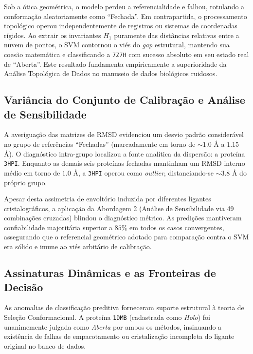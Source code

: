 \documentclass[12pt, a4paper]{article}
\theoremstyle{plain}
\theoremstyle{definition}
\theoremstyle{remark}
\newcommand{\ident}{\hspace{2em}}
\begin{document}
\ident Sob a ótica geométrica, o modelo perdeu a referencialidade e falhou, rotulando a conformação aleatoriamente como \enquote{Fechada}. Em contrapartida, o processamento topológico operou independentemente de registros ou sistemas de coordenadas rígidos. Ao extrair os invariantes $H_1$ puramente das distâncias relativas entre a nuvem de pontos, o SVM contornou o viés do \textit{gap} estrutural, mantendo sua coesão matemática e classificando a \texttt{7Z7H} com sucesso absoluto em seu estado real de \enquote{Aberta}. Este resultado fundamenta empiricamente a superioridade da Análise Topológica de Dados no manuseio de dados biológicos ruidosos.

\subsection{Variância do Conjunto de Calibração e Análise de Sensibilidade}

\ident A averiguação das matrizes de RMSD evidenciou um desvio padrão considerável no grupo de referências \enquote{Fechadas} (marcadamente em torno de $\sim1.0$ Å a $1.15$ Å). O diagnóstico intra-grupo localizou a fonte analítica da dispersão: a proteína \texttt{3HPI}. Enquanto as demais seis proteínas fechadas mantinham um RMSD interno médio em torno de $1.0$ Å, a \texttt{3HPI} operou como \textit{outlier}, distanciando-se $\sim3.8$ Å do próprio grupo. 

\ident Apesar desta assimetria de envoltório induzida por diferentes ligantes cristalográficos, a aplicação da Abordagem 2 (Análise de Sensibilidade via 49 combinações cruzadas) blindou o diagnóstico métrico. As predições mantiveram confiabilidade majoritária superior a $85\%$ em todos os casos convergentes, assegurando que o referencial geométrico adotado para comparação contra o SVM era sólido e imune ao viés arbitário de calibração.

\subsection{Assinaturas Dinâmicas e as Fronteiras de Decisão}

\ident As anomalias de classificação preditiva forneceram suporte estrutural à teoria de Seleção Conformacional. A proteína \texttt{1DMB} (cadastrada como \textit{Holo}) foi unanimemente julgada como \textit{Aberta} por ambos os métodos, insinuando a existência de falhas de empacotamento ou cristalização incompleta do ligante original no banco de dados.
\end{document}
